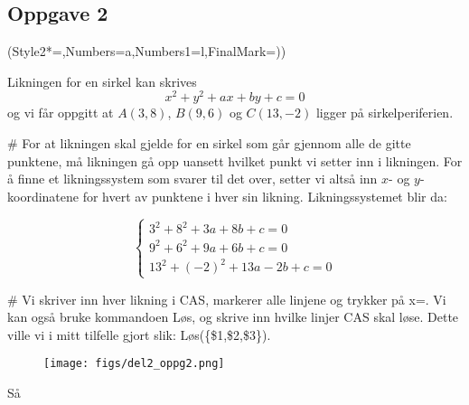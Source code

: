\subsection*{Oppgave 2}

\begin{easylist}[enumerate]
	\ListProperties(Style2*=,Numbers=a,Numbers1=l,FinalMark={)})

	Likningen for en sirkel kan skrives $$x^2 + y^2 + ax + by + c = 0$$ og vi får oppgitt at $A(3,8)$, $B(9,6)$ og $C(13,-2)$ ligger på sirkelperiferien. 
	
	# For at likningen skal gjelde for en sirkel som går gjennom alle de gitte punktene, må likningen gå opp uansett hvilket punkt vi setter inn i likningen. For å finne et likningssystem som svarer til det over, setter vi altså inn $x$- og $y$-koordinatene for hvert av punktene i hver sin likning. Likningssystemet blir da:
	
	\begin{equation*}
		\begin{cases} 3^2 + 8^2 + 3a + 8b + c = 0
		\\ 9^2 + 6^2 + 9a + 6b + c = 0 
		\\ 13^2 + (-2)^2 + 13a - 2b + c = 0 
		\end{cases}
	\end{equation*}
	
	# Vi skriver inn hver likning i CAS, markerer alle linjene og trykker på x=. Vi kan også bruke kommandoen Løs, og skrive inn hvilke linjer CAS skal løse. Dette ville vi i mitt tilfelle gjort slik: Løs(\{\$1,\$2,\$3\}).

	\begin{figure}[ht!]
		\centering
		\texttt{[image: figs/del2\_oppg2.png]}
		\label{fig:del1_oppg7}
	\end{figure}
	
	Så 
\end{easylist}



